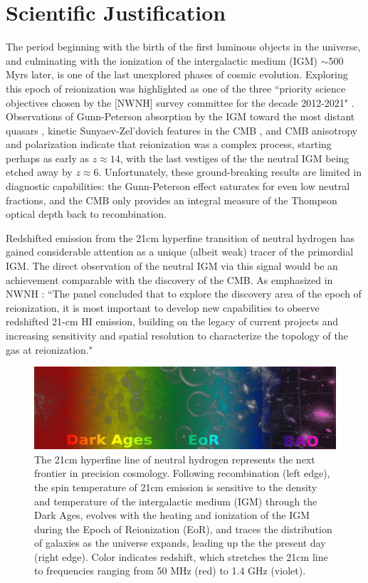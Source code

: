 \documentclass[preprint]{aastex}
\begin{document}
\vspace{-0.25in}
\section{Scientific Justification}

The period beginning with the birth of the first luminous objects in the
universe, and culminating with the ionization of the intergalactic medium (IGM)
$\sim$500 Myrs later, is one of the last unexplored phases of cosmic evolution.
Exploring this epoch of reionization was highlighted as one of the three
``priority science objectives chosen by the [NWNH] survey committee for the
decade 2012-2021" \citep{astro2010}. Observations of Gunn-Peterson absorption
by the IGM toward the most distant quasars \citep{fan_et_al2006}, kinetic
Sunyaev-Zel'dovich features in the CMB \citep{zahn_et_al2012}, and CMB
anisotropy and polarization \citep{page_et_al2007,planck_et_al2013} indicate
that reionization was a complex process, starting perhaps as early as 
$z\approx14$, with the last vestiges of the the neutral IGM being etched away by
$z\approx6$.  Unfortunately, these ground-breaking results are limited in
diagnostic capabilities: the Gunn-Peterson effect saturates for even low
neutral fractions, and the CMB only provides an integral measure of the
Thompson optical depth back to recombination.

Redshifted emission from the 21cm hyperfine transition of neutral hydrogen has
gained considerable attention as a unique (albeit weak) tracer of the
primordial IGM.  The direct observation of the neutral IGM via this signal
would be an achievement comparable with the discovery of the CMB.  As
emphasized in NWNH \citep{astro2010}: ``The panel concluded that to explore the
discovery area of the epoch of reionization, it is most important to develop
new capabilities to observe redshifted 21-cm HI emission, building on the
legacy of current projects and increasing sensitivity and spatial resolution to
characterize the topology of the gas at reionization."

\begin{figure}[!ht]\centering
\includegraphics[width=6in]{plots/21cm_cosmo.jpg}
\caption{\small
The 21cm hyperfine line of neutral hydrogen represents the next frontier in
precision cosmology. Following recombination (left edge), the spin temperature
of 21cm emission is sensitive to the density and temperature of the
intergalactic medium (IGM) through the Dark Ages, evolves with the heating and
ionization of the IGM during the Epoch of Reionization (EoR), and
traces the distribution of galaxies as the universe expands,
leading up the the present day (right edge).  Color indicates
redshift, which stretches the 21cm line to frequencies ranging from 50 MHz
(red) to 1.4 GHz (violet).
}\label{fig:21cm_cosmo}
\end{figure}
\end{document}
